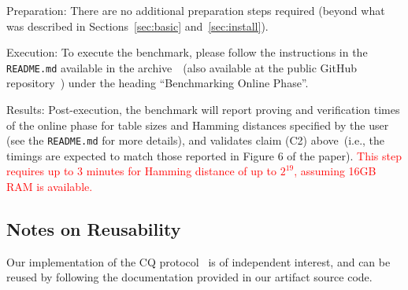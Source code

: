 \documentclass[sigconf]{acmart}
\begin{document}
\begin{compactitem}
		\begin{asparadesc}
			\item[Preparation:] There are no additional preparation steps required (beyond what was described in Sections~\ref{sec:basic} and~\ref{sec:install}).
			
			\item[Execution:] To execute the benchmark, please follow the instructions in the {\tt README.md} available in the archive~\cite{artifact-archive}~(also available at the public GitHub repository~\cite{github-archive}) under the heading ``Benchmarking Online Phase''.
			
			\item[Results:] Post-execution, the benchmark will report proving and verification times of the online phase for table sizes and Hamming distances specified by the user (see the {\tt README.md} for more details), and validates claim (C2) above~(i.e., the timings are expected to match those reported in Figure 6 of the paper). \textcolor{red}{This step requires up to 3 minutes for Hamming distance of up to $2^{19}$, assuming 16GB RAM is available.}
		\end{asparadesc}
	\end{compactitem}
	\bigskip
	
	
	
	\subsection{Notes on Reusability}
	
	Our implementation of the CQ protocol~\cite{EPRINT:EagFioGab22} is of independent interest, and can be reused by following the documentation provided in our artifact source code.  
	
	
%	
	
\end{document}
